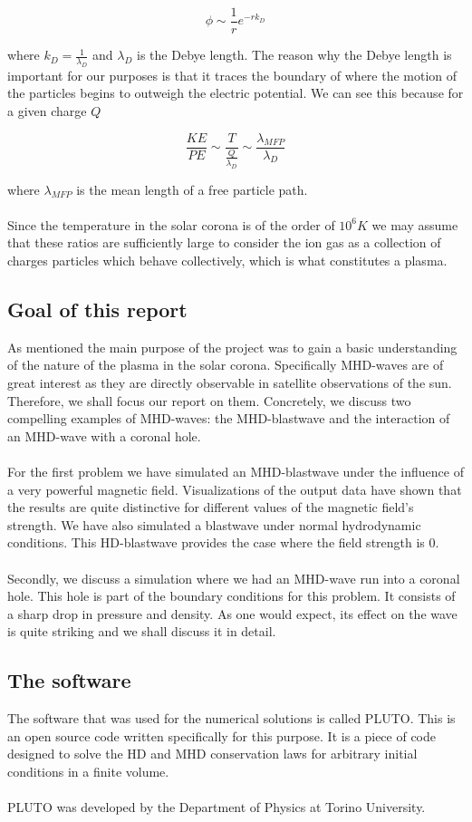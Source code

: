 $$ \phi  \sim \frac{1}{r} e^{-r k_D}$$

where $k_D = \frac{1}{\lambda_D}$ and $ \lambda_D $ is the Debye length. The reason why the Debye length is important for our purposes is that it traces the boundary of where the motion of the particles begins to outweigh the electric potential. We can see this because for a given charge $Q$ 

$$ \frac{KE}{PE}  \sim \frac{T}{\frac{Q}{\lambda_D}}  \sim \frac{\lambda_{MFP}}{\lambda_D} $$

where $\lambda_{MFP}$ is the mean length of a free particle path.\\
\\
Since the temperature in the solar corona is of the order of $10^6 K$ we may assume that these ratios are sufficiently large to consider the ion gas as a collection of charges particles which behave collectively, which is what constitutes a plasma.

\subsection*{Goal of this report}

As mentioned the main purpose of the project was to gain a basic understanding of the nature of the plasma in the solar corona. Specifically MHD-waves are of great interest as they are directly observable in satellite observations of the sun. Therefore, we shall focus our report on them. Concretely, we discuss two compelling examples of MHD-waves: the MHD-blastwave and the interaction of an MHD-wave with a coronal hole.\\
\\
For the first problem we have simulated an MHD-blastwave under the influence of a very powerful magnetic field. Visualizations of the output data have shown that the results are quite distinctive for different values of the magnetic field's strength. We have also simulated a blastwave under normal hydrodynamic conditions. This HD-blastwave provides the case where the field strength is $0$.\\
\\
Secondly, we discuss a simulation where we had an MHD-wave run into a coronal hole. This hole is part of the boundary conditions for this problem. It consists of a sharp drop in pressure and density. As one would expect, its effect on the wave is quite striking and we shall discuss it in detail.

\subsection*{The software}

The software that was used for the numerical solutions is called PLUTO. This is an open source code written specifically for this purpose. It is a piece of code designed to solve the HD and MHD conservation laws for arbitrary initial conditions in a finite volume.\\
\\
PLUTO was developed by the Department of Physics at Torino University. 


